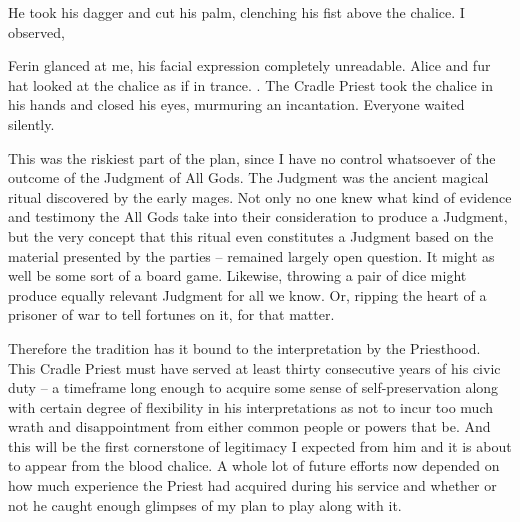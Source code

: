 He took his dagger and cut his palm, clenching his fist above the chalice. I observed,


 Ferin glanced at me, his facial expression completely unreadable.  Alice and fur hat looked at the chalice as if in trance. . The Cradle Priest took the chalice in his hands and closed his eyes, murmuring an incantation. Everyone waited silently.

This was the riskiest part of the plan, since I have no control whatsoever of the outcome of the Judgment of All Gods. The Judgment was the ancient magical ritual discovered by the early mages. Not only no one knew what kind of evidence and testimony the All Gods take into their consideration to produce a Judgment, but the very concept that this ritual even constitutes a Judgment based on the material presented by the parties -- remained largely open question. It might as well be some sort of a board game. Likewise, throwing a pair of dice might produce equally relevant Judgment for all we know. Or, ripping the heart of a prisoner of war to tell fortunes on it, for that matter.

Therefore the tradition has it bound to the interpretation by the Priesthood. This Cradle Priest must have served at least thirty consecutive years of his civic duty -- a timeframe long enough to acquire some sense of self-preservation along with certain degree of flexibility in his interpretations as not to incur too much wrath and disappointment from either common people or powers that be. And this will be the first cornerstone of legitimacy I expected from him and it is about to appear from the blood chalice. A whole lot of future efforts now depended on how much experience the Priest had acquired during his service and whether or not he caught enough glimpses of my plan to play along with it.

